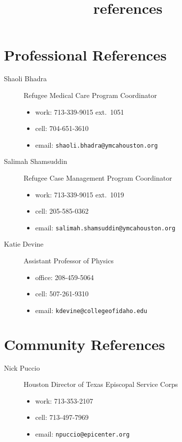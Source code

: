 \documentclass{article}
\title{references}
\newcommand\reference[5]{\item[#1]{#2}\begin{itemize}
\item #3
\item #4
\item #5
\end{itemize}
}
\begin{document}
 

\section*{Professional References}
\begin{description}
	\reference{Shaoli Bhadra}{Refugee Medical Care Program Coordinator}{work: 713-339-9015 ext.\ 1051}{cell: 704-651-3610}{email: \texttt{shaoli.bhadra@ymcahouston.org}}
	\reference{Salimah Shamsuddin}{Refugee Case Management Program Coordinator}{work: 713-339-9015 ext.\ 1019}{cell: 205-585-0362}{email: \texttt{salimah.shamsuddin@ymcahouston.org}}
	\reference{Katie Devine}{Assistant Professor of Physics}{office: 208-459-5064}{cell: 507-261-9310}{email: \texttt{kdevine@collegeofidaho.edu}}
\end{description}

\section*{Community References}

\begin{description}
	\reference{Nick Puccio}{Houston Director of Texas Episcopal Service Corps}{work: 713-353-2107}{cell: 713-497-7969}{email: \texttt{npuccio@epicenter.org}}
\end{description}
\end{document}
